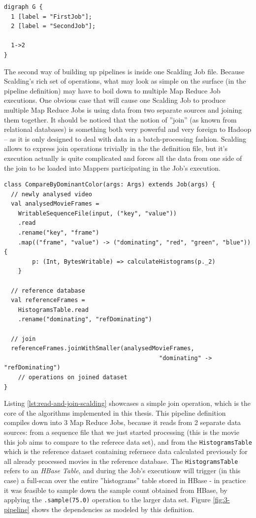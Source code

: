 \begin{lstlisting}[caption={Textual description of graph on Figure \ref{fig:simplect-pipeline}, using the DOT graph description language.}, label={lst:simplest-pipeline-dot}]
digraph G {
  1 [label = "FirstJob"];
  2 [label = "SecondJob"];
  
  1->2
}
\end{lstlisting}

The second way of building up pipelines is inside one Scalding Job file. Because Scalding's rich set of operations, what may look as simple on the surface (in the pipeline definition) may have to boil down to multiple Map Reduce Job executions. One obvious case that will cause one Scalding Job to produce multiple Map Reduce Jobs is using data from two separate sources and joining them together. It should be noticed that the notion of ''join'' (as known from relational databases) is something both very powerful and very foreign to Hadoop -- as it is only designed to deal with data in a batch-processing fashion. Scalding allows to express join operations trivially in the the definition file, but it's execution actually is quite complicated and forces all the data from one side of the join to be loaded into Mappers participating in the Job's execution.

\begin{lstlisting}[caption={Scalding job, reading data from 2 sources and joining them on dominantColor, producing 3 Map Reduce Jobs}, label={lst:read-and-join-scalding}]
class CompareByDominantColor(args: Args) extends Job(args) {
  // newly analysed video
  val analysedMovieFrames = 
    WritableSequenceFile(input, ("key", "value"))
    .read
    .rename("key", "frame")
    .map(("frame", "value") -> ("dominating", "red", "green", "blue")) { 
        p: (Int, BytesWritable) => calculateHistograms(p._2)
    }
  
  // reference database
  val referenceFrames = 
    HistogramsTable.read
    .rename("dominating", "refDominating")

  // join
  referenceFrames.joinWithSmaller(analysedMovieFrames, 
                                            "dominating" -> "refDominating")
    // operations on joined dataset
}
\end{lstlisting}

Listing \ref{lst:read-and-join-scalding} showcases a simple join operation, which is the core of the algorithms implemented in this thesis. This pipeline definition compiles down into 3 Map Reduce Jobs, because it reads from 2 separate data sources: from a sequence file that we just started processing (this is the movie this job aims to compare to the referece data set), and from the \verb|HistogramsTable| which is the reference dataset containing refernece data calculated previously for all already processed movies in the reference database. The \verb|HistogramsTable| refers to an \textit{HBase Table}, and during the Job's executionw will trigger (in this case) a full-scan over the entire ''histograms'' table stored in HBase - in practice it was feasible to sample down the sample count obtained from HBase, by applying the \verb|.sample(75.0)| operation to the larger data set. Figure \ref{fig:3-pipeline} shows the dependencies as modeled by this definition.

